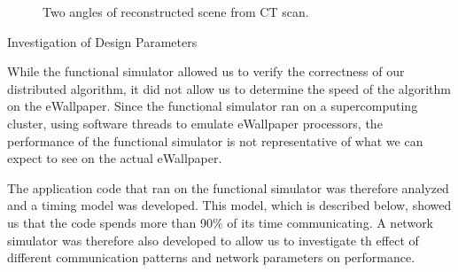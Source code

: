 \documentclass[twocolumn]{article}
\makeatletter
\def\section{\@startsection{section}{1}{\z@}{24pt plus 2 pt
minus 2 pt} {12pt plus 2pt minus 2pt}{\large\bf}}
\makeatother
\begin{document}
\begin{figure}
\begin{centering}

	
\end{centering}
\caption{Two angles of reconstructed scene from CT scan.}
\end{figure}

\section{Investigation of Design Parameters}

While the functional simulator allowed us to verify the correctness of our distributed algorithm, it did not allow us to determine the speed of the algorithm on the eWallpaper. Since the functional simulator ran on a supercomputing cluster, using software threads to emulate eWallpaper processors, the performance of the functional simulator is not representative of what we can expect to see on the actual eWallpaper.

The application code that ran on the functional simulator was therefore analyzed and a timing model was developed. This model, which is described below, showed us that the code spends more than 90\% of its time communicating. A network simulator was therefore also developed to allow us to investigate th effect of different communication patterns and network parameters on performance.
 
\end{document}
